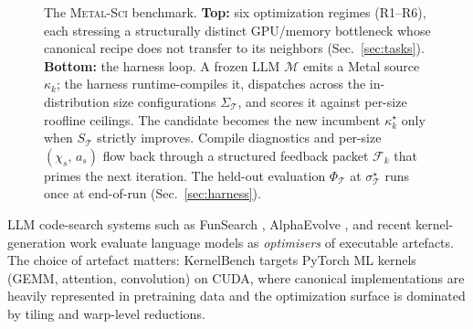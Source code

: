 \documentclass{article}
\theoremstyle{plain}
\theoremstyle{definition}
\theoremstyle{remark}
\begin{document}
\begin{figure}[t]
\caption{The \textsc{Metal-Sci} benchmark.
\textbf{Top:} six optimization regimes (R1--R6), each stressing a structurally distinct GPU/memory bottleneck whose canonical recipe does not transfer to its neighbors (Sec.~\ref{sec:tasks}).
\textbf{Bottom:} the harness loop. A frozen LLM $\mathcal{M}$ emits a Metal source $\kappa_k$; the harness runtime-compiles it, dispatches across the in-distribution size configurations $\Sigma_{\mathcal{T}}$, and scores it against per-size roofline ceilings. The candidate becomes the new incumbent $\kappa^{\star}_{k}$ only when $S_{\mathcal{T}}$ strictly improves. Compile diagnostics and per-size $(\chi_s,\,a_s)$ flow back through a structured feedback packet $\mathcal{F}_k$ that primes the next iteration. The held-out evaluation $\Phi_{\mathcal{T}}$ at $\sigma^{\star}_{\mathcal{T}}$ runs once at end-of-run (Sec.~\ref{sec:harness}).}
\label{fig:overview}
\end{figure}

LLM code-search systems such as FunSearch \cite{funsearch}, AlphaEvolve \cite{novikov2025alphaevolve}, and recent kernel-generation work \cite{ouyang2025kernelbench} evaluate language models as
\emph{optimisers} of executable artefacts. The choice of artefact matters:
KernelBench targets PyTorch ML kernels (GEMM, attention, convolution) on
CUDA, where canonical implementations are heavily represented in
pretraining data and the optimization surface is dominated by tiling and
warp-level reductions.
\end{document}
